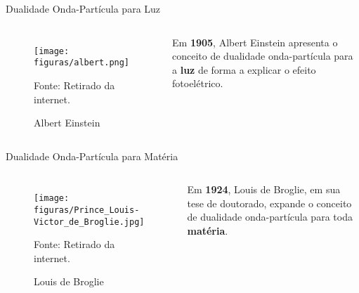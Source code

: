 \begin{frame}{Dualidade Onda-Partícula para Luz}

    \begin{columns}[c]
        \begin{figure}
          \centering
          \caption{Albert Einstein}
          \texttt{[image: figuras/albert.png]}\par
          {\scriptsize Fonte: Retirado da internet.}
        \end{figure}

        Em \textbf{1905}, Albert Einstein apresenta o conceito de dualidade onda-partícula para a \textbf{luz} de forma a explicar o efeito fotoelétrico.

    \end{columns}

    
\end{frame}


\begin{frame}{Dualidade Onda-Partícula para Matéria}

    \begin{columns}[c]

        \begin{figure}
          \centering
          \caption{Louis de Broglie}
          \texttt{[image: figuras/Prince\_Louis-Victor\_de\_Broglie.jpg]}\par
          {\scriptsize Fonte: Retirado da internet.}
        \end{figure}

        Em \textbf{1924}, Louis de Broglie, em sua tese de doutorado, expande o conceito de dualidade onda-partícula para toda \textbf{matéria}.

    \end{columns}

\end{frame}
